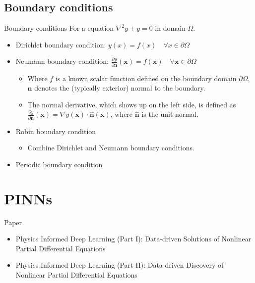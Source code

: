 \documentclass[aspectratio=1610,xcolor={dvipsnames},hyperref={colorlinks,unicode,linkcolor=violet,anchorcolor=BlueViolet,citecolor=YellowOrange,filecolor=black,urlcolor=Aquamarine}]{beamer}
\begin{document}
\subsection{Boundary conditions}
\label{sec:org242e28d}

\begin{frame}[label={sec:orgdc8fb60}]{Boundary conditions}
For a equation \(\nabla^{2}y+y=0\) in domain \(\Omega\).

\begin{itemize}
\item Dirichlet boundary condition: \(y(x)=f(x)\quad \forall x\in \partial \Omega\)
\item Neumann boundary condition: \(\frac {\partial y}{\partial \mathbf {n} }(\mathbf {x} )=f(\mathbf {x} )\quad \forall \mathbf {x} \in \partial \Omega\)
\begin{itemize}
\item Where \(f\) is a known scalar function defined on the boundary domain \(\partial \Omega\), \(\mathbf{n}\) denotes the (typically exterior) normal to the boundary.
\item The normal derivative, which shows up on the left side, is defined as \(\frac {\partial y}{\partial \mathbf {n} }(\mathbf {x} )=\nabla y(\mathbf {x} )\cdot \mathbf {\hat {n}} (\mathbf {x} )\), where \(\mathbf {\hat {n}}\) is the unit normal.
\end{itemize}
\item Robin boundary condition
\begin{itemize}
\item Combine Dirichlet and Neumann boundary conditions.
\end{itemize}
\item Periodic boundary condition
\end{itemize}
\end{frame}

\section{PINNs}
\label{sec:org493dbd1}

\begin{frame}[label={sec:org91e1858}]{Paper}
\begin{itemize}
\item Physics Informed Deep Learning (Part I): Data-driven Solutions of Nonlinear Partial Differential Equations\cite{raissiPhysicsInformedDeep2017}
\item Physics Informed Deep Learning (Part II): Data-driven Discovery of Nonlinear Partial Differential Equations\cite{raissiPhysicsInformedDeep2017a}
\end{itemize}
\end{frame}
\end{document}
